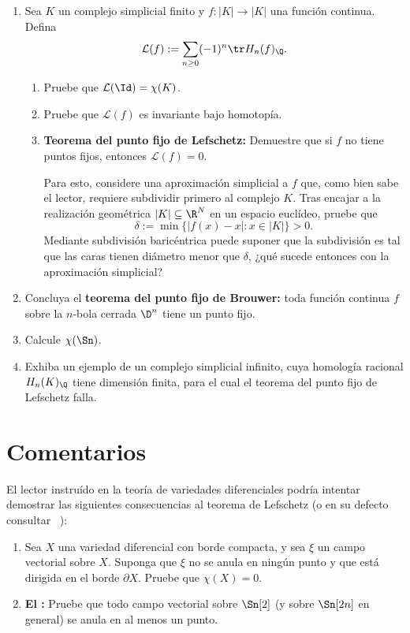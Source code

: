 \documentclass[11pt, reqno]{amsart}
\begin{document}
\begin{enumerate}[resume]
	\item Sea $K$ un complejo simplicial finito y $f \colon |K| \to |K|$ una función continua.
		Defina
		\[
			\mathcal{L}(f) := \sum_{n\ge 0} (-1)^n \tr H_n(f)_\Q.
		\]
		\begin{enumerate}
			\item Pruebe que $\mathcal{L}(\Id) = \chi(K)$.

			\item Pruebe que $\mathcal{L}(f)$ es invariante bajo homotopía.

			\item \textbf{Teorema del punto fijo de Lefschetz:}
				Demuestre que si $f$ no tiene puntos fijos, entonces $\mathcal{L}(f) = 0$.

				\begin{hint}
					Para esto, considere una aproximación simplicial a $f$ que, como bien sabe el lector, requiere
					subdividir primero al complejo $K$.
					Tras encajar a la realización geométrica $|K| \subseteq \R^N$ en un espacio euclídeo, pruebe que
					\[
						\delta := \min\{ |f(x) - x| : x \in |K| \} > 0.
					\]
					Mediante subdivisión baricéntrica puede suponer que la subdivisión es tal que las caras tienen
					diámetro menor que $\delta$, ¿qué sucede entonces con la aproximación simplicial?
				\end{hint}
		\end{enumerate}

	\item\lookright
		Concluya el \textbf{teorema del punto fijo de Brouwer:}
		toda función continua $f$ sobre la $n$-bola cerrada $\D^n$ tiene un punto fijo.

	\item Calcule $\chi(\Sn)$.

	\item\lookup
		Exhiba un ejemplo de un complejo simplicial infinito, cuya homología racional $H_n(K)_\Q$ tiene dimensión finita, para el
		cual el teorema del punto fijo de Lefschetz falla.
\end{enumerate}

\appendix
\section{Comentarios}
El lector instruído en la teoría de variedades diferenciales podría intentar demostrar las siguientes consecuencias al teorema de Lefschetz
(o en su defecto consultar \citeauthor{fomenko:homotopical}~\cite[235]{fomenko:homotopical}):
\begin{enumerate}[resume]
	\item Sea $X$ una variedad diferencial con borde compacta, y sea $\xi$ un campo vectorial sobre $X$.
		Suponga que $\xi$ no se anula en ningún punto y que está dirigida en el borde $\partial X$.
		Pruebe que $\chi(X) = 0$.

	\item \textbf{El :}
		Pruebe que todo campo vectorial sobre $\Sn[2]$ (y sobre $\Sn[2n]$ en general) se anula en al menos un punto.
\end{enumerate}
\end{document}
